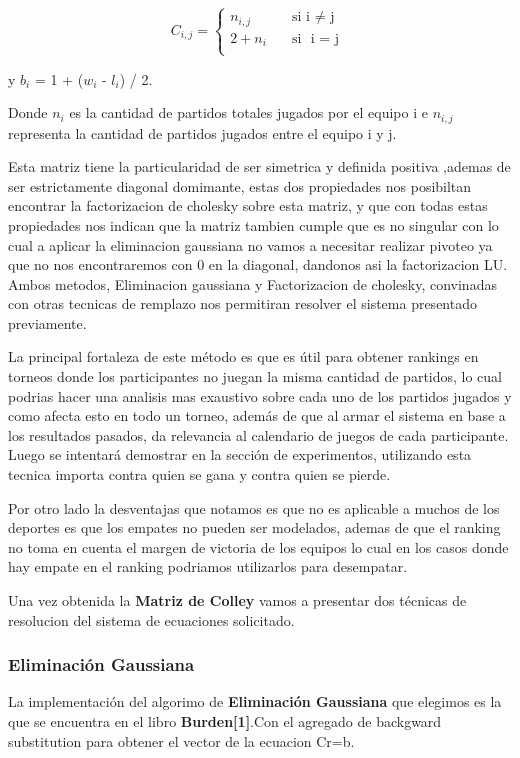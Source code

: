 \[ C_{i,j} =
    \begin{cases}
        n_{i,j}       & \quad \text{si }  \text{i $\neq$ j}\\
        2+n_i & \quad \text{si } \text{ i = j }\\
    \end{cases}

    \]
                    
y $b_i$ = 1 +  ($w_i$ - $l_i$) / 2.

Donde $n_i$ es la cantidad de partidos totales jugados por el equipo i e $n_{i,j}$ representa la cantidad de partidos jugados entre el equipo i y j.

Esta matriz tiene la particularidad de ser simetrica y definida positiva ,ademas de ser estrictamente diagonal domimante, estas dos propiedades nos 
posibiltan encontrar la factorizacion de cholesky sobre esta matriz, y que con todas estas propiedades nos indican que la matriz tambien cumple que es no singular 
con lo cual a aplicar la eliminacion gaussiana no vamos a necesitar realizar pivoteo ya que no nos encontraremos con 0 en la diagonal, dandonos asi la factorizacion LU.
Ambos metodos, Eliminacion gaussiana y Factorizacion de cholesky, convinadas con otras tecnicas de remplazo nos permitiran resolver el sistema presentado previamente.

La principal fortaleza de este método es que es útil para obtener rankings en torneos donde los participantes no juegan la misma cantidad de partidos, lo cual 
podrias hacer una analisis mas exaustivo sobre cada uno de los partidos jugados y como afecta esto en todo un torneo,
además de que al armar el sistema en base a los resultados pasados, da relevancia al calendario de juegos de cada participante. 
Luego se intentará demostrar en la sección de experimentos, utilizando esta tecnica importa contra quien se gana y contra quien se pierde.

Por otro lado la  desventajas que notamos es que no es aplicable a muchos de los deportes es que los empates no pueden ser modelados, ademas de que el ranking no toma en cuenta
el margen de victoria de los equipos lo cual en los casos donde hay empate en el ranking podriamos utilizarlos para desempatar.

Una vez obtenida la \textbf{Matriz de Colley} vamos a  presentar dos técnicas de resolucion del sistema de ecuaciones solicitado.\\

\subsubsection{Eliminación Gaussiana}
La implementación del algorimo de \textbf{Eliminación Gaussiana} que elegimos es la que se encuentra en el libro \textbf{Burden[1]}.Con el agregado de backgward substitution para obtener el vector de la ecuacion Cr=b.

